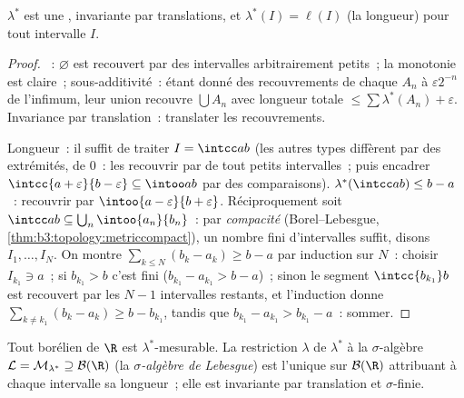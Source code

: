 \begin{lemma}\label{lem:b3:measure:outerbasics}
$\lambda^*$ est une , invariante par
translations, et $\lambda^*(I) = \ell(I)$ (la longueur) pour
tout intervalle $I$.
\end{lemma}

\begin{proof}
~: $\varnothing$ est recouvert par des
intervalles arbitrairement petits~; la monotonie est claire~;
sous-additivité~: étant donné des recouvrements de chaque
$A_n$ à $\varepsilon 2^{-n}$ de l'infimum, leur union
recouvre $\bigcup A_n$ avec longueur totale $\leq \sum
\lambda^*(A_n) + \varepsilon$. Invariance par translation~:
translater les recouvrements.

Longueur~: il suffit de traiter $I = \intcc ab$ (les autres
types diffèrent par des extrémités, de 
$0$~: les recouvrir par de tout petits intervalles~; puis
encadrer $\intcc{a+\varepsilon}{b - \varepsilon} \subseteq
\intoo ab$ par des comparaisons). $\lambda^*(\intcc ab) \leq
b - a$~: recouvrir par $\intoo{a-\varepsilon}{b+\varepsilon}$.
Réciproquement soit $\intcc ab \subseteq
\bigcup_n\intoo{a_n}{b_n}$~: par \emph{compacité}
(Borel--Lebesgue, \cref{thm:b3:topology:metriccompact}), un
nombre fini d'intervalles suffit, disons $I_1, \dots, I_N$.
On montre $\sum_{k\leq N}(b_k - a_k) \geq b - a$ par
induction sur $N$~: choisir $I_{k_1} \ni a$~; si $b_{k_1} > b$
c'est fini ($b_{k_1} - a_{k_1} > b - a$)~; sinon le segment
$\intcc{b_{k_1}}b$ est recouvert par les $N - 1$ intervalles
restants, et l'induction donne $\sum_{k \neq k_1}(b_k - a_k)
\geq b - b_{k_1}$, tandis que $b_{k_1} - a_{k_1} > b_{k_1} -
a$~: sommer.
\end{proof}

\begin{theorem}\label{thm:b3:measure:lebesgue}
Tout borélien de $\R$ est $\lambda^*$-mesurable. La
restriction $\lambda$ de $\lambda^*$ à la $\sigma$-algèbre
$\mathcal L = \mathcal M_{\lambda^*} \supseteq \mathcal
B(\R)$ (la \emph{$\sigma$-algèbre de Lebesgue}) est l'unique
 sur $\mathcal B(\R)$ attribuant à chaque intervalle sa
longueur~; elle est invariante par translation et
$\sigma$-finie.
\end{theorem}

